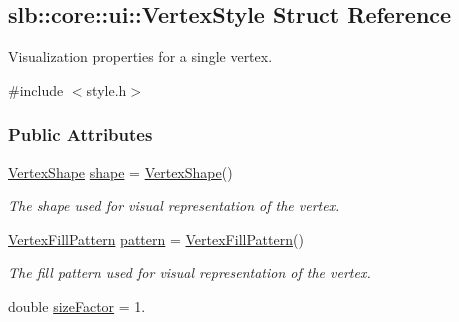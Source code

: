 \hypertarget{structslb_1_1core_1_1ui_1_1VertexStyle}{}\subsection{slb\+:\+:core\+:\+:ui\+:\+:Vertex\+Style Struct Reference}
\label{structslb_1_1core_1_1ui_1_1VertexStyle}


Visualization properties for a single vertex.  




{\ttfamily \#include $<$style.\+h$>$}

\subsubsection*{Public Attributes}
\begin{DoxyCompactItemize}
\item 
\hyperlink{namespaceslb_1_1core_1_1ui_a5bba432158f178915f460bdcf8a047a7}{Vertex\+Shape} \hyperlink{structslb_1_1core_1_1ui_1_1VertexStyle_a9dca063f9fc00c42673edb915f0f5e89}{shape} = \hyperlink{namespaceslb_1_1core_1_1ui_a5bba432158f178915f460bdcf8a047a7}{Vertex\+Shape}()\hypertarget{structslb_1_1core_1_1ui_1_1VertexStyle_a9dca063f9fc00c42673edb915f0f5e89}{}\label{structslb_1_1core_1_1ui_1_1VertexStyle_a9dca063f9fc00c42673edb915f0f5e89}

\begin{DoxyCompactList}\small\item\em The shape used for visual representation of the vertex. \end{DoxyCompactList}\item 
\hyperlink{namespaceslb_1_1core_1_1ui_a0d123eba2567be5964595af181c9c3d1}{Vertex\+Fill\+Pattern} \hyperlink{structslb_1_1core_1_1ui_1_1VertexStyle_a20b4360f57d3b0eb5249e7a59f9b1472}{pattern} = \hyperlink{namespaceslb_1_1core_1_1ui_a0d123eba2567be5964595af181c9c3d1}{Vertex\+Fill\+Pattern}()\hypertarget{structslb_1_1core_1_1ui_1_1VertexStyle_a20b4360f57d3b0eb5249e7a59f9b1472}{}\label{structslb_1_1core_1_1ui_1_1VertexStyle_a20b4360f57d3b0eb5249e7a59f9b1472}

\begin{DoxyCompactList}\small\item\em The fill pattern used for visual representation of the vertex. \end{DoxyCompactList}\item 
double \hyperlink{structslb_1_1core_1_1ui_1_1VertexStyle_a1acdc4a687508cfab8e5b7f892bc3b0d}{size\+Factor} = 1.\hypertarget{structslb_1_1core_1_1ui_1_1VertexStyle_a1acdc4a687508cfab8e5b7f892bc3b0d}{}\label{structslb_1_1core_1_1ui_1_1VertexStyle_a1acdc4a687508cfab8e5b7f892bc3b0d}


\end{DoxyCompactItemize}
